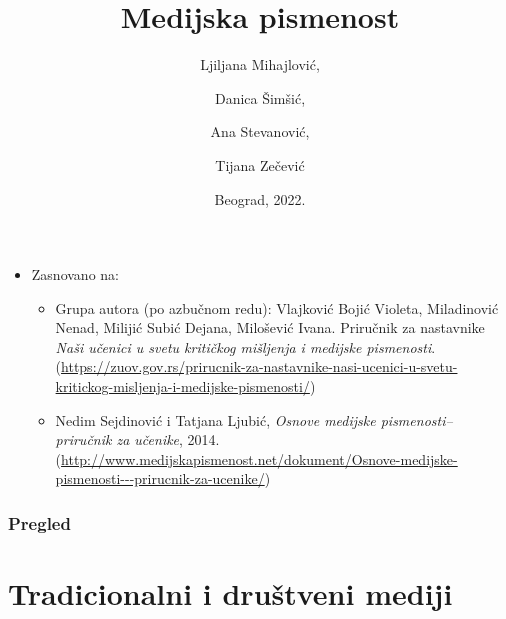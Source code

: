 \documentclass[13pt]{beamer}
\title{Medijska pismenost}
\author{Ljiljana Mihajlović, \and Danica Šimšić, \and Ana Stevanović, \and Tijana Zečević}
\institute{Matematički fakultet \\Univerzitet u Beogradu}
\date{
	\footnotesize{Beograd, 2022.}	
}
\begin{document}
\begin{frame}
	\thispagestyle{empty}
	\titlepage
\end{frame}

\addtocounter{framenumber}{-1}

\begin{frame}
	\begin{itemize}
		\item Zasnovano na:\\
        \begin{itemize}
		\item Grupa autora (po azbučnom redu): Vlajković Bojić Violeta, Miladinović Nenad, Milijić Subić Dejana, Milošević Ivana. Priručnik za nastavnike \emph{ Naši učenici u svetu kritičkog mišljenja i medijske pismenosti}.
		(\url{https://zuov.gov.rs/prirucnik-za-nastavnike-nasi-ucenici-u-svetu-kritickog-misljenja-i-medijske-pismenosti/})


      \item  Nedim Sejdinović i Tatjana Ljubić, \emph{Osnove medijske pismenosti– priručnik za učenike}, 2014.
         (\url{http://www.medijskapismenost.net/dokument/Osnove-medijske-pismenosti---prirucnik-za-ucenike/})\\
           \end{itemize} 

	\end{itemize}
\end{frame}

\begin{frame}
	\frametitle{Pregled} %
	\tableofcontents[hidesubsections] 
\end{frame}

\section{Tradicionalni i društveni mediji}
\end{document}
